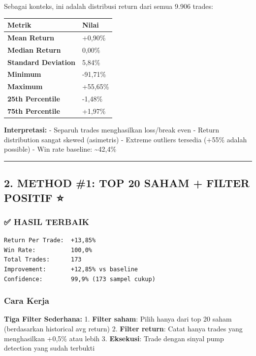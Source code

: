 \documentclass[
  10pt,
  a4paper,
]{article}
\begin{document}
Sebagai konteks, ini adalah distribusi return dari semua 9.906 trades:

\begin{longtable}[]{@{}ll@{}}
\toprule\noalign{}
Metrik & Nilai \\
\midrule\noalign{}
\endhead
\bottomrule\noalign{}
\endlastfoot
\textbf{Mean Return} & +0,90\% \\
\textbf{Median Return} & 0,00\% \\
\textbf{Standard Deviation} & 5,84\% \\
\textbf{Minimum} & -91,71\% \\
\textbf{Maximum} & +55,65\% \\
\textbf{25th Percentile} & -1,48\% \\
\textbf{75th Percentile} & +1,97\% \\
\end{longtable}

\textbf{Interpretasi:} - Separuh trades menghasilkan loss/break even -
Return distribution sangat skewed (asimetris) - Extreme outliers
tersedia (+55\% adalah possible) - Win rate baseline:
\textasciitilde42,4\%

\begin{center}\rule{0.5\linewidth}{0.5pt}\end{center}

\subsection{2. METHOD \#1: TOP 20 SAHAM + FILTER POSITIF
⭐}\label{method-1-top-20-saham-filter-positif}

\subsubsection{✅ HASIL TERBAIK}\label{hasil-terbaik}

\begin{verbatim}
Return Per Trade:  +13,85%
Win Rate:          100,0%
Total Trades:      173
Improvement:       +12,85% vs baseline
Confidence:        99,9% (173 sampel cukup)
\end{verbatim}

\subsubsection{Cara Kerja}\label{cara-kerja}

\textbf{Tiga Filter Sederhana:} 1. \textbf{Filter saham}: Pilih hanya
dari top 20 saham (berdasarkan historical avg return) 2. \textbf{Filter
return}: Catat hanya trades yang menghasilkan +0,5\% atau lebih 3.
\textbf{Eksekusi}: Trade dengan sinyal pump detection yang sudah
terbukti
\end{document}
